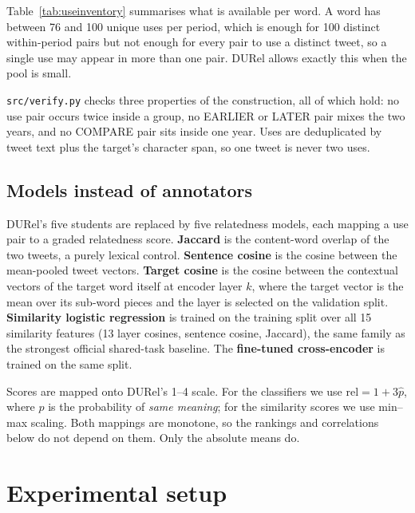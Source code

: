 \documentclass{article}
\newif\iffirstsectiondone
\let\originalsection\section
\renewcommand{\section}{%
  \iffirstsectiondone\Needspace*{0.12\textheight}\else\firstsectiondonetrue\fi
  \originalsection}
\begin{document}
Table~\ref{tab:useinventory} summarises what is available per word. A word has
between 76 and 100 unique uses per period, which is enough for 100 distinct
within-period pairs but not enough for every pair to use a distinct tweet, so a
single use may appear in more than one pair. DURel allows exactly this when the
pool is small.

\texttt{src/verify.py} checks three properties of the construction, all of which
hold: no use pair occurs twice inside a group, no EARLIER or LATER pair mixes the
two years, and no COMPARE pair sits inside one year. Uses are deduplicated by
tweet text plus the target's character span, so one tweet is never two uses.

\begin{table}[t]\centering\small
\caption{Inventory per target word.}
\label{tab:useinventory}

\end{table}

\subsection{Models instead of annotators}
\label{sec:models}

DURel's five students are replaced by five relatedness models, each mapping a
use pair to a graded relatedness score. \textbf{Jaccard} is the content-word
overlap of the two tweets, a purely lexical control. \textbf{Sentence cosine} is
the cosine between the mean-pooled tweet vectors. \textbf{Target cosine} is the
cosine between the contextual vectors of the target word itself at encoder layer
$k$, where the target vector is the mean over its sub-word pieces and the layer
is selected on the validation split. \textbf{Similarity logistic regression} is
trained on the training split over all 15 similarity features (13 layer cosines,
sentence cosine, Jaccard), the same family as the strongest official shared-task
baseline. The \textbf{fine-tuned cross-encoder} is trained on the same split.

Scores are mapped onto DURel's 1--4 scale. For the classifiers we use
$\mathrm{rel}=1+3\hat{p}$, where $\hat{p}$ is the probability of \emph{same
meaning}; for the similarity scores we use min--max scaling. Both mappings are
monotone, so the rankings and correlations below do not depend on them. Only the
absolute means do.

\section{Experimental setup}
\label{sec:setup}
\end{document}
